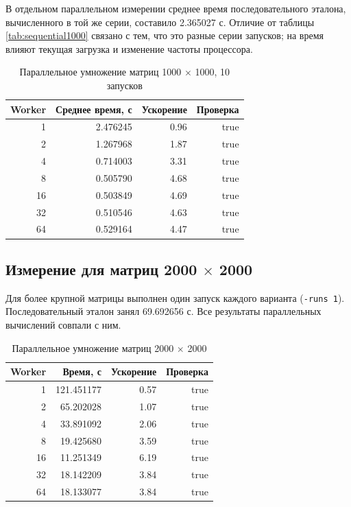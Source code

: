 \documentclass[a4paper,14pt]{extarticle}
\begin{document}
В отдельном параллельном измерении среднее время последовательного эталона,
вычисленного в той же серии, составило 2.365027 с. Отличие от таблицы
\ref{tab:sequential1000} связано с тем, что это разные серии запусков; на
время влияют текущая загрузка и изменение частоты процессора.

\begin{table}[ht]
\centering
\caption{Параллельное умножение матриц 1000 \texorpdfstring{$\times$}{x} 1000, 10 запусков}
\label{tab:parallel1000}
\begin{tabular}{rrrr}
\toprule
Worker & Среднее время, с & Ускорение & Проверка \\
\midrule
1  & 2.476245 & 0.96 & true \\
2  & 1.267968 & 1.87 & true \\
4  & 0.714003 & 3.31 & true \\
8  & 0.505790 & 4.68 & true \\
16 & 0.503849 & 4.69 & true \\
32 & 0.510546 & 4.63 & true \\
64 & 0.529164 & 4.47 & true \\
\bottomrule
\end{tabular}
\end{table}

\subsection{Измерение для матриц 2000 \texorpdfstring{$\times$}{x} 2000}

Для более крупной матрицы выполнен один запуск каждого варианта
(\texttt{-runs 1}). Последовательный эталон занял 69.692656 с. Все результаты
параллельных вычислений совпали с ним.

\begin{table}[ht]
\centering
\caption{Параллельное умножение матриц 2000 \texorpdfstring{$\times$}{x} 2000}
\label{tab:parallel2000}
\begin{tabular}{rrrr}
\toprule
Worker & Время, с & Ускорение & Проверка \\
\midrule
1  & 121.451177 & 0.57 & true \\
2  & 65.202028  & 1.07 & true \\
4  & 33.891092  & 2.06 & true \\
8  & 19.425680  & 3.59 & true \\
16 & 11.251349  & 6.19 & true \\
32 & 18.142209  & 3.84 & true \\
64 & 18.133077  & 3.84 & true \\
\bottomrule
\end{tabular}
\end{table}
\end{document}
